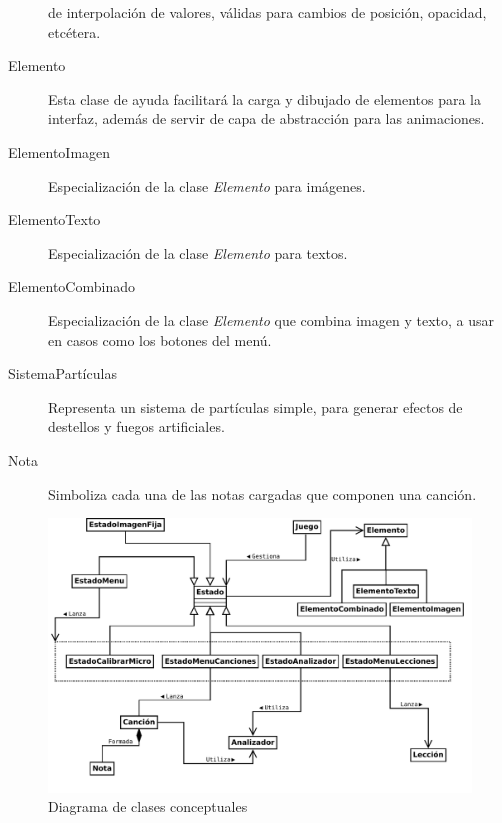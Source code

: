 \begin{description}
  de interpolación de valores, válidas para cambios de posición, opacidad,
  etcétera.
\item[Elemento] Esta clase de ayuda facilitará la carga y dibujado de elementos
  para la interfaz, además de servir de capa de abstracción para las
  animaciones.
\item[ElementoImagen] Especialización de la clase \textit{Elemento} para
  imágenes.
\item[ElementoTexto] Especialización de la clase \textit{Elemento} para textos.
\item[ElementoCombinado] Especialización de la clase \textit{Elemento} que
  combina imagen y texto, a usar en casos como los botones del menú.
\item[SistemaPartículas] Representa un sistema de partículas simple, para
  generar efectos de destellos y fuegos artificiales.
\item[Nota] Simboliza cada una de las notas cargadas que componen una canción.
\end{description}

\begin{figure}[htp!]
  \centering
  \includegraphics[angle=90]{4_analisis/imagen_diagrama_clases_conceptuales}
  \caption{Diagrama de clases conceptuales}
\end{figure}

\pagebreak



